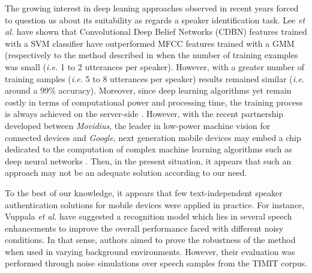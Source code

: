 \documentclass[cryptography,article,submit,moreauthors,pdftex,10pt,a4paper]{mdpi}
\begin{document}
The growing interest in deep leaning approaches observed in recent years forced to question us about its suitability as regards a speaker identification task. Lee\textit{ et al. }\cite{37} have shown that Convolutional Deep Belief Networks (CDBN) features trained with a SVM classifier have outperformed MFCC features trained with a GMM (respectively to the method described in \cite{38} when the number of training examples was small (\textit{i.e.} 1 to 2 utterances per speaker). However, with a greater number of training samples (\textit{i.e.} 5 to 8 utterances per speaker) results remained similar (\textit{i.e.} around a 99\% accuracy). Moreover, since deep learning algorithms yet remain costly in terms of computational power and processing time, the training process is always achieved on the server-side \cite{39}. However, with the recent partnership developed between \textit{Movidius}, the leader in low-power machine vision for connected devices and \textit{Google}, next generation mobile devices may embed a chip dedicated to the computation of complex machine learning algorithms such as deep neural networks \cite{40}. Then, in the present situation, it appears that such an approach may not be an adequate solution according to our need.

To the best of our knowledge, it appears that few text-independent speaker authentication solutions for mobile devices were applied in practice. For instance, Vuppala \textit{et al.} \cite{25} have suggested a recognition model which lies in several speech enhancements to improve the overall performance faced with different noisy conditions. In that sense, authors aimed to prove the robustness of the method when used in varying background environments. However, their evaluation was performed through noise simulations over speech samples from the TIMIT corpus.
\end{document}
